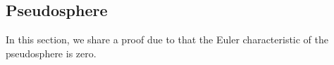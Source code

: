 \subsection{Pseudosphere}
\label{sec:pseudosphere}

In this section, we share a proof due to
\cite{pseudo-app} that the Euler characteristic of the pseudosphere
is zero.


